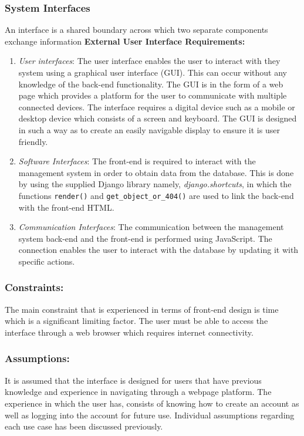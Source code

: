 \documentclass[10pt,twocolumn]{witseiepaper}
\begin{document}
	\subsubsection{System Interfaces}
	An interface is a shared boundary across which two separate components exchange information
	\newline
	\textbf{External User Interface Requirements: }
	\begin{enumerate}
		\item \textit{User interfaces}: The user interface enables the user to interact with they system using a graphical user interface (GUI). This can occur without any knowledge of the back-end functionality. The GUI is in the form of a web page which provides a platform for the user to communicate with multiple connected devices. The interface requires a digital device such as a mobile or desktop device which consists of a screen and keyboard. The GUI is designed in such a way as to create an easily navigable display to ensure it is user friendly.
		\item \textit{Software Interfaces}: The front-end is required to interact with the management system in order to obtain data from the database. This is done by using the supplied Django library namely, \textit{django.shortcuts}, in which the functions \texttt{render()} and \texttt{get\_object\_or\_404()} are used to link the back-end with the front-end HTML. 
		\item \textit{Communication Interfaces}: The communication between the management system back-end and the front-end is performed using JavaScript. The connection enables the user to interact with the database by updating it with specific actions.
	\end{enumerate}
	
	\subsubsection{Constraints:}
	The main constraint that is experienced in terms of front-end design is time which is a significant limiting factor. The user must be able to access the interface through a web browser which requires internet connectivity.
	\subsubsection{Assumptions:}
	It is assumed that the interface is designed for users that have previous knowledge and experience in navigating through a webpage platform. The experience in which the user has, consists of knowing how to create an account as well as logging into the account for future use. Individual assumptions regarding each use case has been discussed previously. \\
\end{document}
